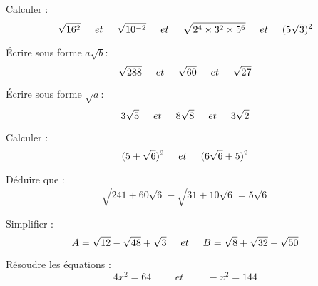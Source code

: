 \documentclass[a4paper,addpoints,12pt]{exam}
\begin{document}
\begin{exo}
\begin{questions}
\question Calculer :
\[ \sqrt{16^{2}} \hspace*{0.5cm} et\hspace*{0.5cm}
 \sqrt{10^{-2}} \hspace*{0.5cm}et\hspace*{0.5cm}
  \sqrt{2^{4}\times 3^{2}\times 5^{6}} \hspace*{0.5cm}et \hspace*{0.5cm}
   (5\sqrt{3})^{2}  \]
   
 \question Écrire sous forme $a\sqrt{b}$:  
 \[  \sqrt{288}\hspace*{0.5cm}et\hspace*{0.5cm}
\sqrt{60}\hspace*{0.5cm}et\hspace*{0.5cm}
\sqrt{27}   \]

\question Écrire sous forme $\sqrt{a}$:
\[  3\sqrt{5}\hspace*{0.5cm}et\hspace*{0.5cm}
8\sqrt{8}\hspace*{0.5cm}et\hspace*{0.5cm}
3\sqrt{2}   \]

\question Calculer :
\[   (5+\sqrt{6})^{2}\hspace*{0.5cm}et\hspace*{0.5cm}
	(6\sqrt{6}+5)^{2}  \]
	
\question Déduire que :
\[  \sqrt{241+60\sqrt{6}}-\sqrt{31+10\sqrt{6}}=5\sqrt{6}  \]

\question Simplifier :
\[
A=\sqrt{12}-\sqrt{48}+\sqrt{3}
\hspace*{0.5cm}et\hspace*{0.5cm}
B=\sqrt{8}+\sqrt{32}-\sqrt{50}
\]

\question Résoudre les équations :
\[
4x^{2}=64
\hspace{1cm}et\hspace{1cm}
-x^{2}=144
\]	
\end{questions}

\end{exo}
\end{document}
